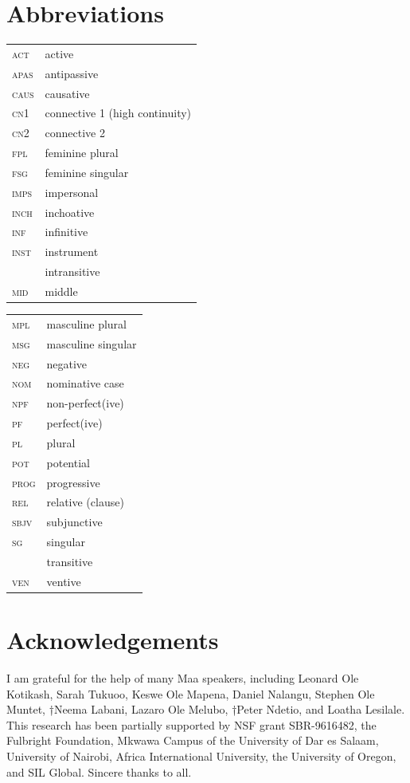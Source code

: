 \documentclass[output=paper,colorlinks,citecolor=brown
]{langscibook}
\begin{document}
\section*{Abbreviations}
\begin{tabularx} {.45\textwidth}{>{\scshape}lQ}
\textsc{act} & active\\
\textsc{apas} & antipassive\\
\textsc{caus} & causative\\
\textsc{cn1} & connective 1 (high continuity)\\
\textsc{cn2} & connective 2 \\
\textsc{fpl} & feminine plural\\
\textsc{fsg} & feminine singular\\
\textsc{imps} & impersonal\\
\textsc{inch} & inchoative\\
\textsc{inf} & infinitive\\
\textsc{inst} & instrument\\
 & intransitive\\
\textsc{mid} & middle\\
\end{tabularx}
\begin{tabularx} {.45\textwidth}{>{\scshape}lQ}
\textsc{mpl} & masculine plural\\
\textsc{msg} & masculine singular\\
\textsc{neg} & negative\\
\textsc{nom} & nominative case\\
\textsc{npf} & non-perfect(ive)\\
\textsc{pf} & perfect(ive)\\
\textsc{pl} & plural \\
\textsc{pot} & potential\\
\textsc{prog} & progressive\\
\textsc{rel} & relative (clause)\\
\textsc{sbjv} & subjunctive\\
\textsc{sg} & singular\\
 & transitive\\
\textsc{ven} & ventive\\
\end{tabularx}


\section*{Acknowledgements}
I am grateful for the help of many Maa speakers, including Leonard Ole Kotikash, Sarah Tukuoo, Keswe Ole Mapena, Daniel Nalangu, Stephen Ole Muntet, †Neema Labani, Lazaro Ole Melubo, †Peter Ndetio, and Loatha Lesilale. This research has been partially supported by NSF grant SBR-9616482, the Fulbright Foundation, Mkwawa Campus of the University of Dar es Salaam, University of Nairobi, Africa International University, the University of Oregon, and SIL Global. Sincere thanks to all.

\sloppy %
\printbibliography[heading=subbibliography,notkeyword=this]
\end{document}
